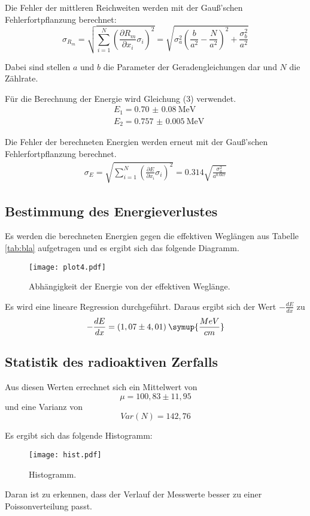 Die Fehler der mittleren Reichweiten werden mit der Gauß'schen Fehlerfortpflanzung berechnet:
\begin{equation}
  \sigma_{R_m} = \sqrt{
      \sum\limits_{i = 1}^N
       \left( \frac{\partial R_m}{\partial x_i} \sigma_i \right)^{\!\! 2}
     } = \sqrt{\sigma_{a}^{2} \left(\frac{b}{a^{2}} - \frac{N}{a^{2}}\right)^{2} + \frac{\sigma_{b}^{2}}{a^{2}} }
\end{equation}

Dabei sind stellen $a$ und $b$ die Parameter der Geradengleichungen dar und $N$ die Zählrate.

Für die Berechnung der Energie wird Gleichung (3) verwendet.
\begin{align*}
  &E_1 = \SI{0.70(8)}{\mega\eV} \\
  &E_2 = \SI{0.757(5)}{\mega\eV}
\end{align*}

Die Fehler der berechneten Energien werden erneut mit der Gauß'schen Fehlerfortpflanzung berechnet.
\begin{align*}
  \sigma_{E} = \sqrt{
      \sum\limits_{i = 1}^N
       \left( \frac{\partial E}{\partial x_i} \sigma_i \right)^{\!\! 2}
     } = 0.314 \sqrt{\frac{\sigma_{a}^{2}}{a^{0.667}}}
\end{align*}


\subsection{Bestimmung des Energieverlustes}
Es werden die berechneten Energien gegen die effektiven Weglängen aus Tabelle \ref{tab:bla} aufgetragen und es ergibt sich das folgende Diagramm.
\begin{figure}[H]
  \centering
  \texttt{[image: plot4.pdf]}
  \caption{Abhängigkeit der Energie von der effektiven Weglänge.}
  \label{fig:plot4}
\end{figure}
Es wird eine lineare Regression durchgeführt. Daraus ergibt sich der Wert $-\frac{dE}{dx}$ zu
\begin{equation*}
  -\frac{dE}{dx} = (1,07 \pm 4,01) \: \symup{\frac{MeV}{cm}}
\end{equation*}

\subsection{Statistik des radioaktiven Zerfalls}
Aus diesen Werten errechnet sich ein Mittelwert von
\begin{equation*}
  \mu = 100,83 \pm 11,95
\end{equation*}
und eine Varianz von
\begin{equation*}
  Var(N) = 142,76
\end{equation*}

Es ergibt sich das folgende Histogramm:
\begin{figure}[H]
  \centering
  \texttt{[image: hist.pdf]}
  \caption{Histogramm.}
  \label{fig:hist}
\end{figure}

Daran ist zu erkennen, dass der Verlauf der Messwerte besser zu einer Poissonverteilung passt.
